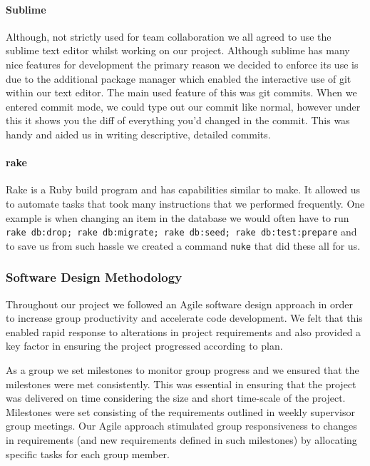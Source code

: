     \paragraph{Sublime\cite{sublime}} Although, not strictly used for team collaboration we all agreed to use the sublime text editor whilst working on our project. Although sublime has many nice features for development the primary reason we decided to enforce its use is due to the additional package manager\cite{sublime_pm} which enabled the interactive use of git within our text editor.
    The main used feature of this was git commits. When we entered commit mode, we could type out our commit like normal, however under this it shows you the diff of everything you'd changed in the commit. This was handy and aided us in writing descriptive, detailed commits.

    \paragraph{rake\cite{rake}} Rake is a Ruby build program and has capabilities similar to make. It allowed us to automate tasks that took many instructions that we performed frequently. One example is when changing an item in the database we would often have to run \verb!rake db:drop; rake db:migrate; rake db:seed; rake db:test:prepare! and to save us from such hassle we created a command \verb!nuke! that did these all for us.

  \subsubsection{Software Design Methodology}
    Throughout our project we followed an Agile software design approach in order to increase group productivity and accelerate code development. We felt that this enabled rapid response to alterations in project requirements and also provided a key factor in ensuring the project progressed according to plan.

    As a group we set milestones to monitor group progress and we ensured that the milestones were met consistently. This was essential in ensuring that the project was delivered on time considering the size and short time-scale of the project. Milestones were set consisting of the requirements outlined in weekly supervisor group meetings. Our Agile approach stimulated group responsiveness to changes in requirements (and new requirements defined in such milestones) by allocating specific tasks for each group member. 

